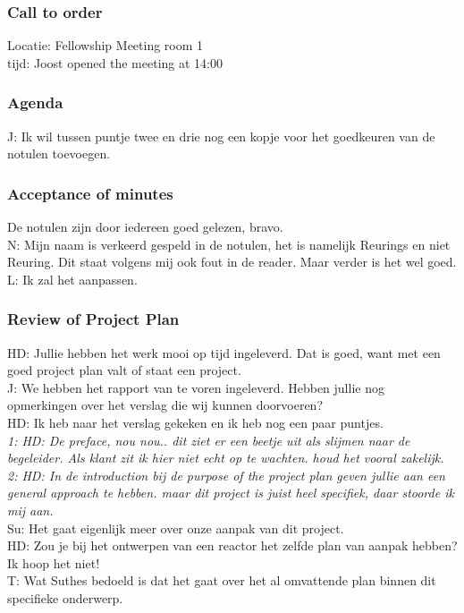 \subsubsection{Call to order}
Locatie: Fellowship Meeting room 1\\
tijd: Joost opened the meeting at 14:00\\

\subsubsection{Agenda}
J: Ik wil tussen puntje twee en drie nog een kopje voor het goedkeuren van de notulen toevoegen.\\

\subsubsection{Acceptance of minutes}
De notulen zijn door iedereen goed gelezen, bravo.\\

N: Mijn naam is verkeerd gespeld in de notulen, het is namelijk Reurings en niet Reuring. Dit staat volgens mij ook fout in de reader. Maar verder is het wel goed.\\

L: Ik zal het aanpassen.\\

\subsubsection{Review of Project Plan}
HD: Jullie hebben het werk mooi op tijd ingeleverd. Dat is goed, want met een goed project plan valt of staat een project.\\

J: We hebben het rapport van te voren ingeleverd. Hebben jullie nog opmerkingen over het verslag die wij kunnen doorvoeren?\\

HD: Ik heb naar het verslag gekeken en ik heb nog een paar puntjes.\\
\textit{1: HD: De preface, nou nou.. dit ziet er een beetje uit als slijmen naar de begeleider. Als klant zit ik hier niet echt op te wachten. houd het vooral zakelijk.}\\

\textit{2: HD: In de introduction bij de purpose of the project plan geven jullie aan een general approach te hebben. maar dit project is juist heel specifiek, daar stoorde ik mij aan.}\\
Su: Het gaat eigenlijk meer over onze aanpak van dit project.\\
HD: Zou je bij het ontwerpen van een reactor het zelfde plan van aanpak hebben? Ik hoop het niet!\\
T: Wat Suthes bedoeld is dat het gaat over het al omvattende plan binnen dit specifieke onderwerp.\\


